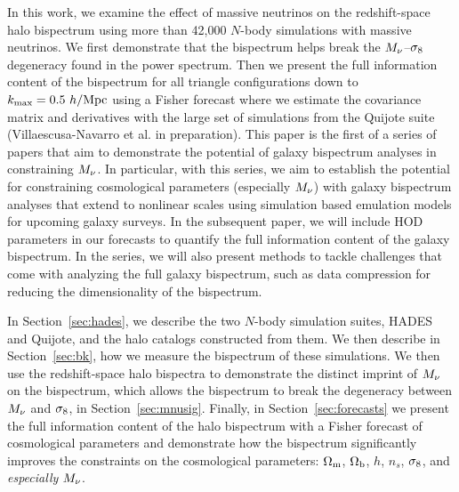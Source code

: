 In this work, we examine the effect of massive neutrinos on the redshift-space 
halo bispectrum using more than 42,000 $N$-body simulations with massive neutrinos. 
We first demonstrate that the bispectrum helps break the $M_\nu$--$\sigma_8$ degeneracy 
found in the power spectrum. Then we present the full information content of the 
bispectrum for all triangle configurations down to $k_{\rm max} = 0.5~h/{\rm Mpc}$ using 
a Fisher forecast where we estimate the covariance matrix and derivatives with 
the large set of simulations from the Quijote suite (Villaescusa-Navarro et al. in preparation). 
This paper is the first of a series of papers that aim to demonstrate the potential 
of galaxy bispectrum analyses in constraining $M_\nu$. In particular, with this 
series, we aim to establish the potential for constraining cosmological parameters 
(especially $M_\nu$) with galaxy bispectrum analyses that extend to nonlinear scales 
using simulation based emulation models for upcoming galaxy surveys. In the subsequent 
paper, we will include HOD parameters in our forecasts to quantify the full information 
content of the galaxy bispectrum. In the series, we will also present methods to 
tackle challenges that come with analyzing the full galaxy bispectrum, such as data 
compression for reducing the dimensionality of the bispectrum. 

In Section~\ref{sec:hades}, we describe the two $N$-body simulation suites, HADES and Quijote, 
and the halo catalogs constructed from them. We then describe in Section~\ref{sec:bk}, 
how we measure the bispectrum of these simulations. 
We then use the redshift-space halo bispectra to demonstrate the distinct imprint of 
$M_\nu$ on the bispectrum, which allows the bispectrum to break the degeneracy between 
$M_\nu$ and $\sigma_8$, in Section~\ref{sec:mnusig}. Finally, in Section~\ref{sec:forecasts} 
we present the full information content of the halo bispectrum with a Fisher forecast 
of cosmological parameters and demonstrate how the bispectrum significantly improves 
the constraints on the cosmological parameters: $\Omega_{\rm m}$, $\Omega_{\rm b}$, $h$, $n_s$, $\sigma_8$, and {\em especially} $M_\nu$. 
